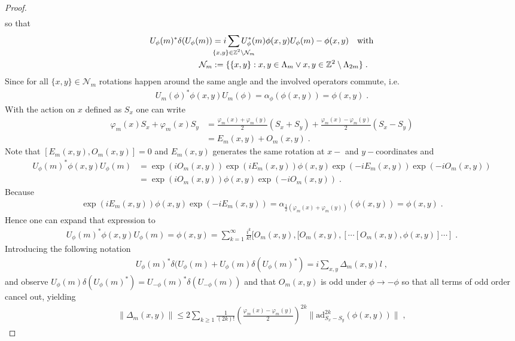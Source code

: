 \documentclass[
a4paper, %
11pt, %
onecolumn, %
openany, %
]{memoir}
\theoremstyle{definition}
\theoremstyle{remark}
\theoremstyle{plain}
\begin{document}
\begin{proof}
\begin{align}
\end{align}
so that \begin{align} U_{\phi}(m)^*\delta(U_{\phi}(m))&=i\sum_{\mathclap{\{x,y\}\in\mathbb{Z}^2\setminus \mathcal{N}_{m}}} U_{\phi}^*(m)\phi(x,y)U_{\phi}(m)-\phi(x,y)\quad \text{with}\\\mathcal{N}_m &:=\{\{x,y\}: x,y\in\Lambda_m \lor x,y\in\mathbb{Z}^2\setminus\Lambda_{2m}\} \;.
\end{align}
Since for all $\{x,y\}\in\mathcal{N}_m$ rotations happen around the same angle and the involved operators commute, i.e. \begin{align}
U_m(\phi)^*\phi(x,y)U_m(\phi)=\alpha_{\phi}(\phi(x,y))=\phi(x,y)\;.
\end{align}
With the action on $x$ defined as $S_x$ one can write \begin{align}
\varphi_m(x)S_x+\varphi_m(x)S_y&=\frac{\varphi_m(x)+\varphi_m(y)}{2}(S_x+S_y)+\frac{\varphi_m(x)-\varphi_m(y)}{2}(S_x-S_y)\\ &= E_m(x,y)+O_m(x,y)\; .
\end{align}
Note that $[E_m(x,y),O_m(x,y)]=0$ and $E_m(x,y)$ generates the same rotation at $x-$ and $y-$coordinates and \begin{align}
U_{\phi}(m)^*\phi(x,y)U_{\phi}(m)&=\exp(i O_m(x,y))\exp(i E_m(x,y))\phi(x,y)\exp(-iE_m(x,y))\exp(-i O_m(x,y))\\
&= \exp(iO_m(x,y))\phi(x,y)\exp(-i O_m(x,y))\; .
\end{align}
Because \begin{align}
\exp(i E_m(x,y))\phi(x,y)\exp(-i E_m(x,y))=\alpha_{\frac{1}{2}(\varphi_m(x)+\varphi_m(y))}(\phi(x,y))=\phi(x,y)\; .
\end{align}
Hence one can expand that expression to \begin{align}
U_{\phi}(m)^*\phi(x,y)U_{\phi}(m) = \phi(x,y)=\sum_{k=1}^{\infty} \frac{i^k}{k!}[O_m(x,y),[O_m(x,y),[\cdots[O_m(x,y),\phi(x,y)]\cdots]\; . \label{eqn::merminproof}
\end{align}
Introducing the following notation \begin{align}
U_{\phi}(m)^*\delta(U_{\phi}(m)+U_{\phi}(m)\delta(U_{\phi}(m)^*)=i\sum_{x,y}\Delta_m(x,y)l\; ,
\end{align}
and observe $U_{\phi}(m)\delta(U_{\phi}(m)^*)=U_{-\phi}(m)^*\delta(U_{-\phi}(m))$ and  that $O_m(x,y)$ is odd under $\phi\rightarrow -\phi$ so that all terms of odd order cancel out, yielding \begin{align}
\| \Delta_m(x,y)\| \leq 2 \sum_{k\geq 1} \frac{1}{(2k)!}\left(\frac{\varphi_m(x)-\varphi_m(y)}{2}\right)^{2k} \| \mathrm{ad}_{S_x-S_y}^{2k}(\phi(x,y))\|\; ,

\end{align}
\end{proof}
\end{document}
